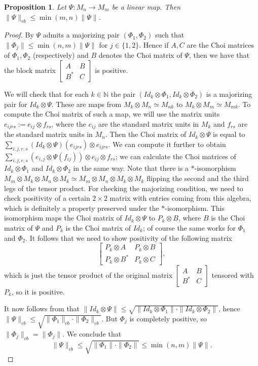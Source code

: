 \documentclass[11pt]{article}
\numberwithin{theorem}{section}
\newtheorem{prop}[theorem]{Proposition}
\begin{document}
\begin{prop}
Let $\Psi: M_n \to M_m$ be a linear map. Then $\|\Psi\|_{cb} \leqslant \min(m,n) \|\Psi\|$.
\end{prop}
\begin{proof}
By \cite[Corollary 6.7]{Ando} $\Psi$ admits a majorizing pair $(\Phi_1, \Phi_2)$ such that $\|\Phi_j\| \leqslant \min(n,m) \|\Psi\|$ for $j \in \{1,2\}$. Hence if $A, C$ are the Choi matrices of $\Phi_1, \Phi_2$ (respectively) and $B$ denotes the Choi matrix of $\Psi$, then we have that the block matrix $
\left[\begin{array}{cc} A & B \\ B^{\ast} & C \end{array}\right]
$ is positive.

We will check that for each $k \in \mathbb{N}$ the pair $(Id_{k}\otimes \Phi_{1}, Id_{k}\otimes \Phi_{2})$ is a majorizing pair for $Id_k\otimes \Psi$. These are maps from $ M_{k} \otimes M_{n} \simeq M_{nk}$ to $M_{k} \otimes M_{m} \simeq M_{mk}$. To compute the Choi matrix of such a map, we will use the matrix units $e_{ijrs} := e_{ij} \otimes f_{rs} $, where the $e_{ij}$ are the standard matrix units in $M_{k}$ and $f_{rs}$ are the standard matrix units in $M_{n}$. Then the Choi matrix of $Id_k \otimes \Psi$ is equal to $\sum_{i,j,r,s} (Id_k \otimes \Psi)(e_{ijrs}) \otimes e_{ijrs}$. We can compute it further to obtain $\sum_{i,j,r,s} (e_{i,j}\otimes \Psi(f_{ij})) \otimes e_{ij} \otimes f_{rs}$; we can calculate the Choi matrices of $Id_k\otimes \Phi_{1}$ and $Id_k\otimes \Phi_{2}$ in the same way. Note that there is a $\ast$-isomorphism $M_{m} \otimes M_{k} \otimes M_{n} \otimes M_{k} \simeq M_{m} \otimes M_{n} \otimes M_{k} \otimes M_{k}$ flipping the second and the third legs of the tensor product. For checking the majorizing condition, we need to check positivity of a certain $2 \times 2$ matrix with entries coming from this algebra, which is definitely a property preserved under the $\ast$-isomorphism. This isomorphism maps the Choi matrix of $Id_k\otimes \Psi$ to $P_k\otimes B$, where $B$ is the Choi matrix of $\Psi$ and $P_k$ is the Choi matrix of $Id_{k}$; of course the same works for $\Phi_1$ and $\Phi_2$. It follows that we need to show positivity of the following matrix 
\[
\left[\begin{array}{cc} P_{k} \otimes A & P_{k} \otimes B  \\ P_{k} \otimes B^{\ast} & P_{k} \otimes C \end{array}\right],
\]
which is just the tensor product of the original matrix $
\left[\begin{array}{cc} A & B \\ B^{\ast} & C \end{array}\right]
$ tensored with $P_k$, so it is positive.

It now follows from \cite[Theorem 5.2]{Ando} that $\|Id_k\otimes \Psi\| \leqslant \sqrt{\|Id_k\otimes \Phi_1\|\cdot \|Id_k \otimes \Phi_2\|}$, hence $\|\Psi\|_{cb} \leqslant \sqrt{\|\Phi_1\|_{cb}\cdot \|\Phi_2\|_{cb}}$. But $\Phi_j$ is completely positive, so $\|\Phi_j\|_{cb} = \|\Phi_j\|$. We conclude that 
\[
\|\Psi\|_{cb} \leqslant \sqrt{\|\Phi_1\|\cdot \|\Phi_2\|} \leqslant \min(n,m) \|\Psi\|.
\]
\end{proof}
\end{document}
